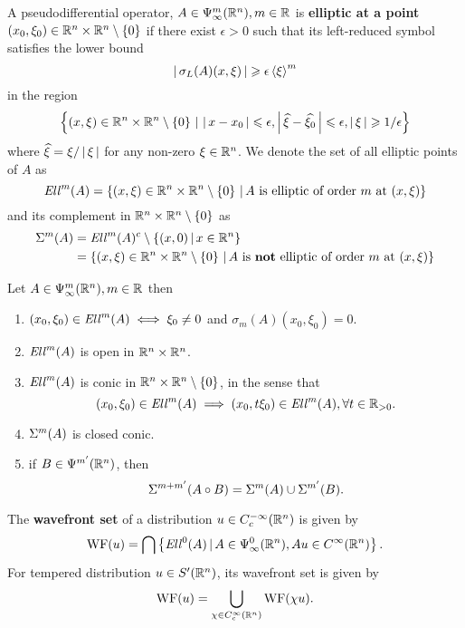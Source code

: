 \documentclass{article}
\begin{document}
\begin{fdefinition}
    A pseudodifferential operator, $A \in \Psi^m_\infty(\R^n), m \in \R$ is \textbf{elliptic at a point} $(x_0, \xi_0) \in \R^n \times \R^n \setminus \set{0}$ if there exist $\epsilon > 0$ such that its left-reduced symbol satisfies the lower bound
    \[
    \abs{\sigma_L(A)(x, \xi)} \geq \epsilon \sym[\xi]^m
    \]
    in the region
    \[
    \set{(x, \xi) \in \R^n \times \R^n \setminus \set{0} \wh \abs{x - x_0} \leq \epsilon, \abs{\widehat{\xi} - \widehat{\xi_0}} \leq \epsilon, \abs{\xi} \geq 1/\epsilon}
    \]
    where $\widehat{\xi} = \xi / \abs{\xi}$ for any non-zero $\xi \in \R^n$. We denote the set of all elliptic points of $A$ as 
    \[
    \Ell^m(A) = \set{(x, \xi) \in \R^n \times \R^n \setminus \set{0} \wh A \text{  is elliptic of order $m$ at } (x, \xi)}
    \]
    and its complement in $\R^n \times \R^n \setminus \set{0}$ as 
    \begin{align*}
    \Char^m(A) 
    &= \Ell^m(A)^c \setminus \set{(x, 0)\wh x \in \R^n} \\
    &= \set{(x, \xi) \in \R^n \times \R^n \setminus \set{0} \wh A \text{  is \textbf{not} elliptic of order $m$ at } (x, \xi)}
    \end{align*}
\end{fdefinition}

\begin{flemma}
    Let $A \in \Psi^m_\infty(\R^n), m \in \R$ then 
    \begin{enumerate}
        \item $(x_0, \xi_0) \in \Ell^m(A) \iff \xi_0 \neq 0 $ and $\sigma_m(A)(x_0, \xi_0) = 0$.
        \item $\Ell^m(A) $ is open in $\R^n \times \R^n$. 
        \item $\Ell^m(A)$ is conic in $\R^n \times \R^n \setminus \set{0}$, in the sense that 
        \[(x_0, \xi_0) \in \Ell^m(A) \implies (x_0, t \xi_0) \in \Ell^m(A), \forall t \in \R_{>0}.\] 
        \item $\Char^m(A)$ is closed conic. 
        \item if $B \in \Psi^{m'}(\R^n)$, then 
        \[\Char^{m + m'}(A \circ B) = \Char^m(A) \cup \Char^{m'}(B).\]
    \end{enumerate}
\end{flemma}


\begin{fdefinition}
    The \textbf{wavefront set} of a distribution $u \in C^{-\infty}_c(\R^n)$ is given by 
    \begin{align*}
    \WF(u) = \bigcap \set{\Ell^0(A) \wh A \in \Psi^0_\infty(\R^n), Au \in C^\infty(\R^n)}. 
    \end{align*}
    For tempered distribution $u \in S'(\R^n)$, its wavefront set is given by 
    \begin{align*}
    \WF(u) = \bigcup_{\chi \in C^\infty_c(\R^n)} \WF(\chi u). 
    \end{align*}
\end{fdefinition}
\end{document}
